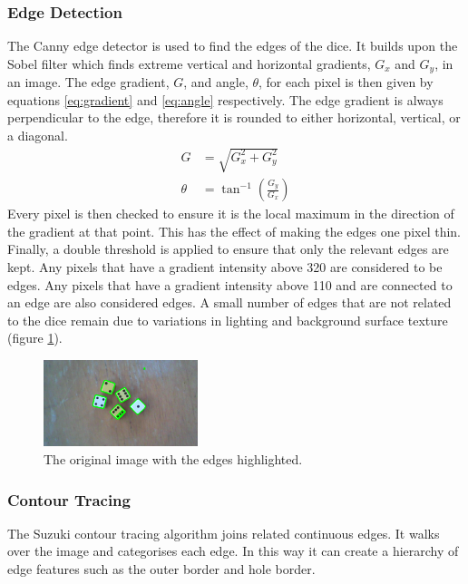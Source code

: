 \documentclass[conference]{IEEEtran}
\begin{document}
\subsubsection{Edge Detection}
The Canny edge detector \cite{Canny1986} is used to find the edges of the dice.
It builds upon the Sobel filter \cite{Sobel2014} which finds extreme vertical and horizontal gradients, $G_x$ and $G_y$, in an image.
The edge gradient, $G$, and angle, $\theta$, for each pixel is then given by equations \ref{eq:gradient} and \ref{eq:angle} respectively.
The edge gradient is always perpendicular to the edge, therefore it is rounded to either horizontal, vertical, or a diagonal.
\begin{align}
	G &= \sqrt{G_x^2 + G_y^2} \label{eq:gradient} \\[1em]
	\theta &= \tan^{-1}\left(\frac{G_y}{G_x}\right) \label{eq:angle}
\end{align}
Every pixel is then checked to ensure it is the local maximum in the direction of the gradient at that point.
This has the effect of making the edges one pixel thin.
Finally, a double threshold is applied to ensure that only the relevant edges are kept.
Any pixels that have a gradient intensity above 320 are considered to be edges.
Any pixels that have a gradient intensity above 110 and are connected to an edge are also considered edges.
A small number of edges that are not related to the dice remain due to variations in lighting and background surface texture (figure \ref{fig:canny}).
\begin{figure}
	\centering
	\includegraphics[width=0.4\textwidth]{canny}
	\caption{The original image with the edges highlighted.}
	\label{fig:canny}
\end{figure}

\subsubsection{Contour Tracing}
The Suzuki contour tracing algorithm \cite{Suzuki1985} joins related continuous edges.
It walks over the image and categorises each edge. 
In this way it can create a hierarchy of edge features such as the outer border and hole border.
\end{document}
